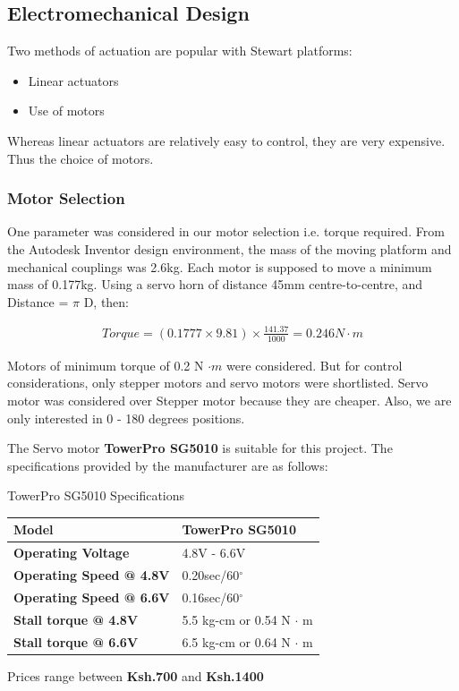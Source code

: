 \subsection{Electromechanical Design}
Two methods of actuation are popular with Stewart platforms:
\begin{itemize}
\item Linear actuators
\item Use of motors
\end{itemize}
Whereas linear actuators are relatively easy to control, they are very expensive. Thus the choice of motors.

\subsubsection{Motor Selection}
One parameter was considered in our motor selection i.e. torque required. From the Autodesk Inventor design environment, the mass of the moving platform and mechanical couplings was 2.6kg. Each motor is supposed to move a minimum mass of 0.177kg. Using a servo horn of distance 45mm centre-to-centre, and Distance = $ \pi $ D, then:
\begin{ceqn}
\begin{align}
	Torque = (0.1777 \times 9.81)\times \frac{141.37}{1000} = 0.246 N\cdot m
\end{align}
\end{ceqn}
Motors of minimum torque of 0.2 N $\cdot m$ were considered. But for control considerations, only stepper motors and servo motors were shortlisted. Servo motor was considered over Stepper motor because they are cheaper. Also, we are only interested in 0 - 180 degrees positions.

The Servo motor \textbf{TowerPro SG5010} is suitable for this project. The specifications provided by the manufacturer are as follows:

\begin{table}[!h]
\caption[Motor Specifications]{TowerPro SG5010 Specifications}
\end{table}
\begin{center}
\begin{tabular}{|l|l|}
\hline
\textbf{Model}& TowerPro SG5010\\
\hline
\textbf{Operating Voltage} & 4.8V - 6.6V\\
\hline
\textbf{Operating Speed @ 4.8V} & 0.20sec/60$^{\circ}$\\
\hline
\textbf{Operating Speed @ 6.6V}& 0.16sec/60$^{\circ}$\\
\hline
\textbf{Stall torque @ 4.8V} & 5.5 kg-cm or 0.54 N $\cdot$ m\\
\hline
\textbf{Stall torque @ 6.6V} & 6.5 kg-cm or 0.64 N $\cdot$ m\\
\hline
\end{tabular}
\end{center}
Prices range between \textbf{Ksh.700} and \textbf{Ksh.1400}

